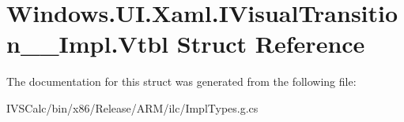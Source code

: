 \hypertarget{struct_windows_1_1_u_i_1_1_xaml_1_1_i_visual_transition_____impl_1_1_vtbl}{}\section{Windows.\+U\+I.\+Xaml.\+I\+Visual\+Transition\+\_\+\+\_\+\+Impl.\+Vtbl Struct Reference}
\label{struct_windows_1_1_u_i_1_1_xaml_1_1_i_visual_transition_____impl_1_1_vtbl}


The documentation for this struct was generated from the following file\+:\begin{DoxyCompactItemize}
\item 
I\+V\+S\+Calc/bin/x86/\+Release/\+A\+R\+M/ilc/Impl\+Types.\+g.\+cs\end{DoxyCompactItemize}
